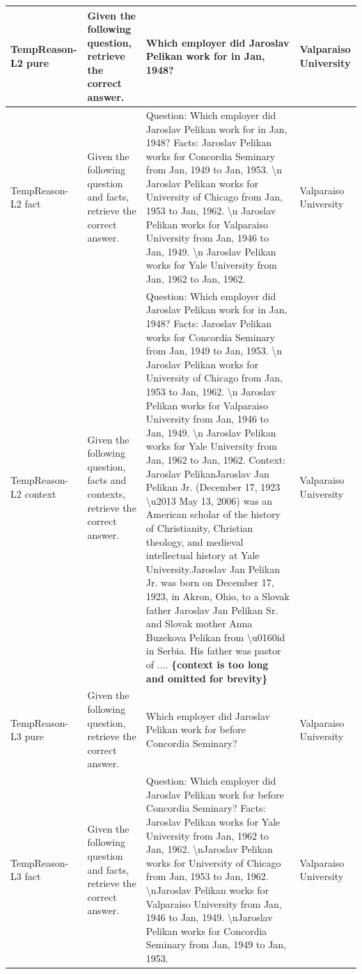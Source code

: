 {\begin{longtable}{ p{} | p{} | p{} | p{}}
\midrule
TempReason-L2 pure &Given the following question, retrieve the correct answer. &Which employer did Jaroslav Pelikan work for in Jan, 1948? &Valparaiso University \\
\midrule
TempReason-L2 fact &Given the following question and facts, retrieve the correct answer. &Question: Which employer did Jaroslav Pelikan work for in Jan, 1948? Facts: Jaroslav Pelikan works for Concordia Seminary from Jan, 1949 to Jan, 1953. \textbackslash n Jaroslav Pelikan works for University of Chicago from Jan, 1953 to Jan, 1962. \textbackslash n Jaroslav Pelikan works for Valparaiso University from Jan, 1946 to Jan, 1949. \textbackslash n Jaroslav Pelikan works for Yale University from Jan, 1962 to Jan, 1962. &Valparaiso University \\
\midrule
TempReason-L2 context &Given the following question, facts and contexts, retrieve the correct answer. &Question: Which employer did Jaroslav Pelikan work for in Jan, 1948? Facts: Jaroslav Pelikan works for Concordia Seminary from Jan, 1949 to Jan, 1953. \textbackslash n Jaroslav Pelikan works for University of Chicago from Jan, 1953 to Jan, 1962. \textbackslash n Jaroslav Pelikan works for Valparaiso University from Jan, 1946 to Jan, 1949. \textbackslash n Jaroslav Pelikan works for Yale University from Jan, 1962 to Jan, 1962. Context: Jaroslav PelikanJaroslav Jan Pelikan Jr. (December 17, 1923 \textbackslash u2013 May 13, 2006) was an American scholar of the history of Christianity, Christian theology, and medieval intellectual history at Yale University.Jaroslav Jan Pelikan Jr. was born on December 17, 1923, in Akron, Ohio, to a Slovak father Jaroslav Jan Pelikan Sr. and Slovak mother Anna Buzekova Pelikan from \textbackslash u0160id in Serbia. His father was pastor of .... \textbf{\{context is too long and omitted for brevity\}} &Valparaiso University\\
\midrule
TempReason-L3 pure &Given the following question, retrieve the correct answer. &Which employer did Jaroslav Pelikan work for before Concordia Seminary? &Valparaiso University \\
\midrule
TempReason-L3 fact &Given the following question and facts, retrieve the correct answer. &Question: Which employer did Jaroslav Pelikan work for before Concordia Seminary? Facts: Jaroslav Pelikan works for Yale University from Jan, 1962 to Jan, 1962. \textbackslash nJaroslav Pelikan works for University of Chicago from Jan, 1953 to Jan, 1962. \textbackslash nJaroslav Pelikan works for Valparaiso University from Jan, 1946 to Jan, 1949. \textbackslash nJaroslav Pelikan works for Concordia Seminary from Jan, 1949 to Jan, 1953. &Valparaiso University \\

\end{longtable}}
